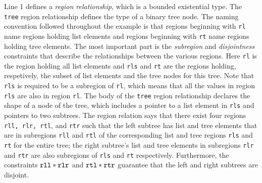 Line 1 defines a {\em region relationship}, which is a bounded existential type.  The
{\tt tree} region relationship defines the type of a binary tree
node. The naming convention followed throughout the example is that
regions beginning with {\tt rl} name regions 
holding list elements and regions beginning with {\tt rt} name
regions holding tree elements.  The most important part is the {\em
  subregion} and {\em disjointness} constraints that describe the
relationships between the various regions.  Here {\tt rl} is the
region holding all list elements and {\tt rls} and {\tt rt} are the
regions holding, respetively, the subset of list elements and the tree
nodes for this tree.  Note that {\tt rls} is required to be a
subregion of {\tt rl}, which means that all the values in region {\tt
  rls} are also in region {\tt rl}.  The body of the {\tt tree} region
relationship declares the shape of a node of the tree, which includes
a pointer to a list element in {\tt rls} and pointers to two
subtrees. The region relation says that there exist four regions {\tt
  rll, rlr, rtl}, and {\tt rtr} such that the left subtree has list
and tree elements that are in subregions {\tt rll} and {\tt rtl} of
the corresponding list and tree regions {\tt rls} and {\tt rt} for the
entire tree; the right subtree's list and tree elements in subregions
{\tt rlr} and {\tt rtr} are also subregions of {\tt rls} and {\tt rt}
respectively.  Furthermore, the constraints $\tt rll \ast rlr$ and
$\tt rtl \ast rtr$ guarantee that the left and right subtrees are
disjoint.

